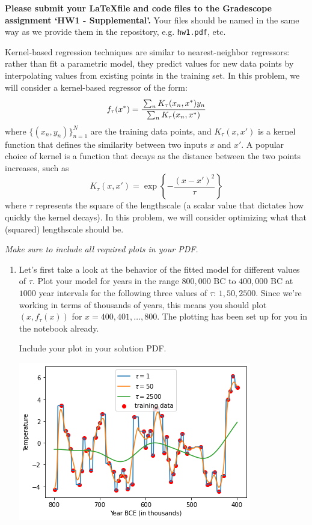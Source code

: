 \documentclass[submit]{harvardml}
\begin{document}
\textbf{Please submit your \LaTeX file and code files to the
  Gradescope assignment `HW1 - Supplemental'.} Your files should be
named in the same way as we provide them in the repository,
e.g. \texttt{hw1.pdf}, etc.


\begin{problem}
Kernel-based regression techniques are similar to nearest-neighbor
regressors: rather than fit a parametric model, they predict values
for new data points by interpolating values from existing points in
the training set.  In this problem, we will consider a kernel-based
regressor of the form:
\begin{equation*}
  f_\tau(x^*) = \cfrac{\sum_{n} K_\tau(x_n,x^*) y_n}{\sum_n K_\tau(x_n, x^*)} 
\end{equation*}
where $\{(x_n,y_n)\}_{n = 1} ^N$ are the training data points, and $K_\tau(x,x')$ is a
kernel function that defines the similarity between two inputs $x$ and
$x'$. A popular choice of kernel is a function that decays as the
distance between the two points increases, such as
\begin{equation*}
  K_\tau(x,x') = \exp\left\{-\frac{(x-x')^2}{\tau}\right\}
\end{equation*}
where $\tau$ represents the square of the lengthscale (a scalar value that 
dictates how quickly the kernel decays).  In this
problem, we will consider optimizing what that (squared) lengthscale
should be.

\noindent\emph{Make sure to include all required plots in your PDF.}

\begin{enumerate}
  
\item Let's first take a look at the behavior of the fitted model for different values of $\tau$. Plot your model for years in the range $800,000$ BC to $400,000$ BC at $1000$ year intervals for the following three values of $\tau$: $1, 50, 2500$. Since we're working in terms of thousands of years, this means you should plot $(x, f_\tau(x))$ for $x = 400, 401, \dots, 800$. The plotting has been set up for you in the notebook already.


Include your plot in your solution PDF.
\begin{center}
\includegraphics[width=.5\textwidth]{hw1/download.png}
\end{center}


\end{enumerate}
\end{problem}
\end{document}
